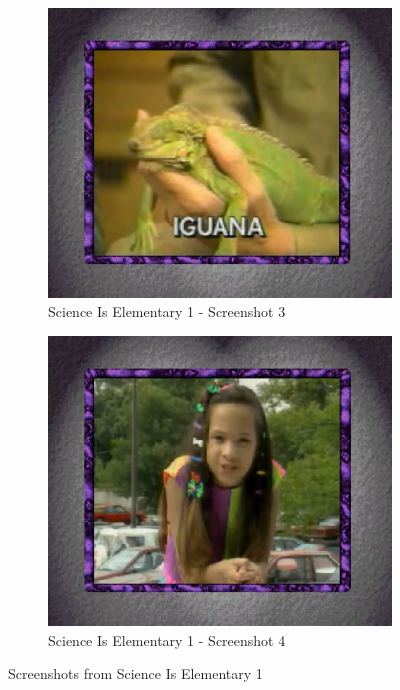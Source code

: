 \begin{figure}[H]
    \begin{subfigure}{0.45\textwidth}
        \centering
        \includegraphics[width=\linewidth]{Games/ScienceIsElementary/Images/ScienceIsElementary1Image3.png}
        \caption{Science Is Elementary 1 - Screenshot 3}
    \end{subfigure}
    \begin{subfigure}{0.45\textwidth}
        \centering
        \includegraphics[width=\linewidth]{Games/ScienceIsElementary/Images/ScienceIsElementary1Image4.png}
        \caption{Science Is Elementary 1 - Screenshot 4}
    \end{subfigure}
    \caption{Screenshots from Science Is Elementary 1}
\end{figure}